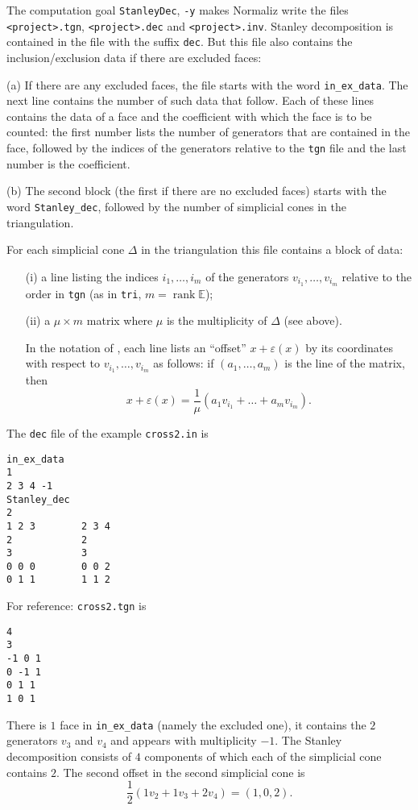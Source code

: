 \documentclass[12pt,a4paper]{scrartcl}
\newcounter{listi}
\theoremstyle{definition}
\def\EE{{\mathbb E}}
\DeclareMathOperator{\rank}{rank}
\let\epsilon=\varepsilon
\def\ttt{\texttt}
\begin{document}
{The computation goal \ttt{StanleyDec}, \ttt{-y} makes Normaliz 
write the files  \ttt{<project>.tgn}, \verb|<project>.dec| and \verb|<project>.inv|.   Stanley decomposition is contained in the file with the suffix \verb|dec|. But this file also contains the inclusion/exclusion data if there are excluded faces:

(a) If there are any excluded faces, the file starts with the word
\verb|in_ex_data|. The next line contains the number of such data that follow.
Each of these lines contains the data of a face and the coefficient with which
the face is to be counted: the first number lists the number of generators that
are contained in the face, followed by the indices of the generators relative
to the \verb|tgn| file and the last number is the coefficient.

(b) The second block (the first if there are no excluded faces) starts with
the word \verb|Stanley_dec|, followed by the number of simplicial cones in the
triangulation.

For each simplicial cone $\Delta$ in the
triangulation this file contains a block of data:
\begin{enumerate}
	\item[(i)] a line listing the indices $i_1,\dots,i_m$ of the
	generators $v_{i_1},\dots,v_{i_m}$ relative to the
	order in \ttt{tgn} (as in \ttt{tri}, $m=\rank \EE$);
	
	\item[(ii)] a $\mu\times m$ matrix where $\mu$ is the
	multiplicity of $\Delta$ (see above).
	
	In the notation of \cite{BIS}, each line lists an
	``offset'' $x+\epsilon(x)$  by its coordinates with
	respect to $v_{i_1},\dots,v_{i_m}$ as follows: if
	$(a_1,\dots,a_m)$ is the line of the matrix, then
	$$
	x+\epsilon(x)=\frac{1}{\mu}(a_1v_{i_1}+\dots+a_mv_{i_m}).
	$$
\end{enumerate}


The \verb|dec| file of the example \verb|cross2.in| is
\begin{Verbatim}
in_ex_data
1
2 3 4 -1
Stanley_dec
2
1 2 3        2 3 4 
2            2
3            3
0 0 0        0 0 2 
0 1 1        1 1 2 
\end{Verbatim}
For reference: \verb|cross2.tgn| is
\begin{Verbatim}
4
3
-1 0 1 
0 -1 1 
0 1 1 
1 0 1 
\end{Verbatim}

There is $1$ face in \verb|in_ex_data| (namely the excluded one), it contains the $2$ generators $v_3$ and $v_4$  and appears with multiplicity $-1$. The Stanley decomposition consists of $4$ components of which each of the simplicial cone contains $2$. The second offset in the second simplicial cone is
$$
\frac12 (1v_2+1v_3+2v_4)=(1,0,2).
$$ 

}
\end{document}

